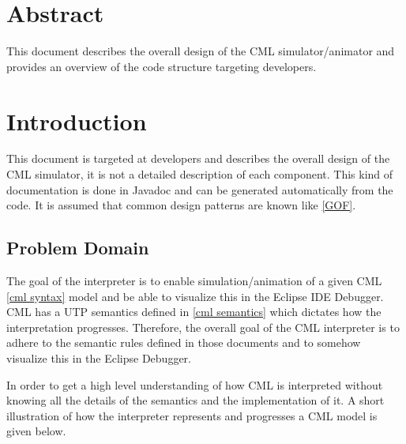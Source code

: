 \documentclass[a4paper, 10pt]{include/compassreport}   %
\begin{document}
\maketitle


\section*{Abstract}
\label{sec:abstract}

This document describes the overall design of the CML
simulator/animator and provides an overview of the code structure
targeting developers.

\newpage

\tableofcontents
\newpage

\section{Introduction}\label{sec:introduction}
This document is targeted at developers and describes the overall
design of the CML simulator, it is not a detailed description of each
component. This kind of documentation is done in Javadoc and can be
generated automatically from the code. It is assumed that common
design patterns are known like \ref{GOF}.

\subsection{Problem Domain}\label{sec:problem_domain}
The goal of the interpreter is to enable simulation/animation of a
given CML \ref{cml syntax} model and be able to visualize this in the
Eclipse IDE Debugger. CML has a UTP semantics defined in \ref{cml
semantics} which dictates how the interpretation progresses. Therefore, the
overall goal of the CML interpreter is to adhere to the semantic
rules defined in those documents and to somehow visualize this in the
Eclipse Debugger.

In order to get a high level understanding of how CML is interpreted
without knowing all the details of the semantics and the
implementation of it. A short illustration of how the interpreter
represents and progresses a CML model is given below. 
\end{document}
